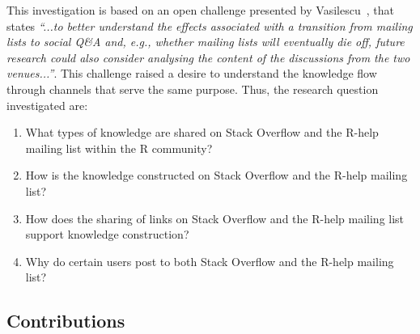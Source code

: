 \documentclass{sig-alternate-05-2015}
\begin{document}
	This investigation is based on an open challenge presented by Vasilescu~\cite{Vasilescu2014b}, that states \textit{``...to better understand the effects associated with a transition from mailing lists to social Q\&A and, e.g., whether mailing lists will eventually die off, future research could also consider analysing the content of the discussions from the two venues...''}.
	This challenge raised a desire to understand the knowledge flow through channels that serve the same purpose.
	Thus, the research question investigated are:

	\begin{enumerate}[\bfseries RQ-1.]
		\item What types of knowledge are shared on Stack Overflow and the R-help mailing list within the R community?
		\item How is the knowledge constructed on Stack Overflow and the R-help mailing list? 
		\item How does the sharing of links on Stack Overflow and the R-help mailing list support knowledge construction? 
		\item Why do certain users post to both Stack Overflow and the R-help mailing list?
	\end{enumerate}

\subsection{Contributions}
\end{document}
